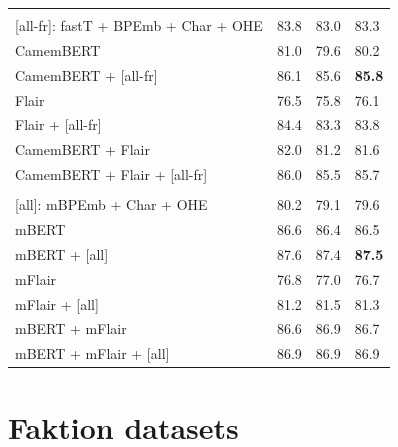 \documentclass[12pt,a4paper,]{book}
\begin{document}
\begin{table}
\begin{tabular}[t]{llll}
\addlinespace[0.3em]
\multicolumn{4}{l}{\textbf{Monolingual French embeddings}}\\
\hspace{1em}[all-fr]: fastT + BPEmb + Char + OHE & 83.8 & 83.0 & 83.3\\
\hspace{1em}CamemBERT & 81.0 & 79.6 & 80.2\\
\hspace{1em}CamemBERT + [all-fr] & 86.1 & 85.6 & \textbf{85.8}\\
\hspace{1em}Flair & 76.5 & 75.8 & 76.1\\
\hspace{1em}Flair + [all-fr] & 84.4 & 83.3 & 83.8\\
\hspace{1em}CamemBERT + Flair & 82.0 & 81.2 & 81.6\\
\hspace{1em}CamemBERT + Flair + [all-fr] & 86.0 & 85.5 & 85.7\\
\addlinespace[0.3em]
\multicolumn{4}{l}{\textbf{Multilingual embeddings}}\\
\hspace{1em}[all]: mBPEmb + Char + OHE & 80.2 & 79.1 & 79.6\\
\hspace{1em}mBERT & 86.6 & 86.4 & 86.5\\
\hspace{1em}mBERT + [all] & 87.6 & 87.4 & \textbf{87.5}\\
\hspace{1em}mFlair & 76.8 & 77.0 & 76.7\\
\hspace{1em}mFlair + [all] & 81.2 & 81.5 & 81.3\\
\hspace{1em}mBERT + mFlair & 86.6 & 86.9 & 86.7\\
\hspace{1em}mBERT + mFlair + [all] & 86.9 & 86.9 & 86.9\\
\bottomrule
\end{tabular}
\end{table}



\hypertarget{faktion-datasets-1}{%
\section{Faktion datasets}\label{faktion-datasets-1}}
\end{document}
